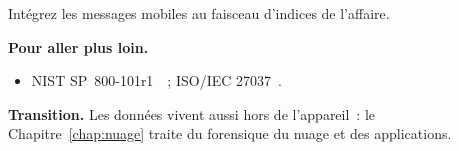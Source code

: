 \begin{boxexo}[title={\ding{45}\quad Exercice~14.10. Faisceau \niveauexpert}]
Intégrez les messages mobiles au faisceau d'indices de l'affaire.
\end{boxexo}

\bigskip

\begin{boxinfo}
\textbf{Pour aller plus loin.}
\begin{itemize}
    \item NIST SP~800-101r1~\cite{nist800101}~; ISO/IEC 27037~\cite{iso27037}.
\end{itemize}
\end{boxinfo}

\begin{boxinfo}
\textbf{Transition.} Les données vivent aussi hors de l'appareil~: le
Chapitre~\ref{chap:nuage} traite du forensique du nuage et des applications.
\end{boxinfo}
